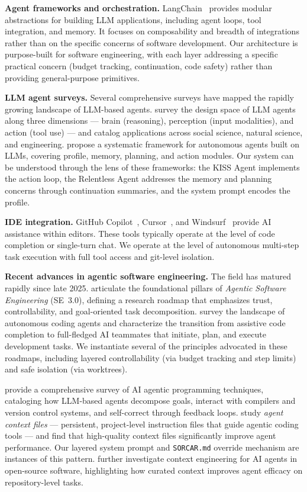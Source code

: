 \documentclass{article}
\begin{document}
\textbf{Agent frameworks and orchestration.}
LangChain~\citep{langchain2022} provides modular abstractions for
building LLM applications, including agent loops, tool integration,
and memory.  It focuses on composability and breadth of integrations
rather than on the specific concerns of software development.  Our
architecture is purpose-built for software engineering, with
each layer addressing a specific practical concern (budget tracking,
continuation, code safety) rather than providing general-purpose
primitives.

\textbf{LLM agent surveys.}
Several comprehensive surveys have mapped the rapidly growing
landscape of LLM-based agents.
\citet{xi2023rise} survey the design space of LLM agents along
three dimensions --- brain (reasoning), perception (input modalities),
and action (tool use) --- and catalog applications across social
science, natural science, and engineering.
\citet{wang2024survey} propose a systematic framework for autonomous
agents built on LLMs, covering profile, memory, planning, and action
modules.  Our system can be understood through the lens of these
frameworks: the KISS Agent implements the action loop, the Relentless
Agent addresses the memory and planning concerns through continuation
summaries, and the system prompt encodes the profile.

\textbf{IDE integration.}
GitHub Copilot~\citep{copilot2021}, Cursor~\citep{cursor2024}, and
Windsurf~\citep{windsurf2024} provide AI assistance within editors.
These tools typically operate at the level of code completion or
single-turn chat.  We operate at the level of autonomous
multi-step task execution with full tool access and git-level
isolation.

\textbf{Recent advances in agentic software engineering.}
The field has matured rapidly since late 2025.
\citet{hassan2025agentic} articulate the foundational pillars of
\emph{Agentic Software Engineering} (SE~3.0), defining a research
roadmap that emphasizes trust, controllability, and goal-oriented task
decomposition.  \citet{li2025rise} survey the landscape of autonomous
coding agents and characterize the transition from assistive code
completion to full-fledged AI teammates that initiate, plan, and
execute development tasks.  We instantiate several of the principles
advocated in these roadmaps, including layered controllability (via
budget tracking and step limits) and safe isolation (via worktrees).

\citet{wang2025agentic} provide a comprehensive survey of AI agentic
programming techniques, cataloging how LLM-based agents decompose
goals, interact with compilers and version control systems, and
self-correct through feedback loops.
\citet{chatlatanagulchai2025readmes} study \emph{agent context files}
--- persistent, project-level instruction files that guide agentic
coding tools --- and find that high-quality context files significantly
improve agent performance.  Our layered system prompt and
\texttt{SORCAR.md} override mechanism are instances of this pattern.
\citet{mohsenimofidi2025context} further investigate context
engineering for AI agents in open-source software, highlighting how
curated context improves agent efficacy on repository-level tasks.
\end{document}
